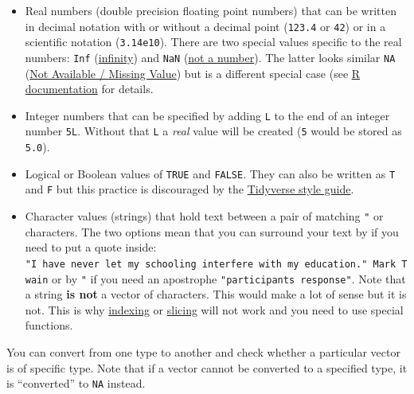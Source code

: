 \documentclass[
]{book}
\providecommand{\tightlist}{%
  \setlength{\itemsep}{0pt}\setlength{\parskip}{0pt}}
\begin{document}
\begin{itemize}
\tightlist
\item
  Real numbers (double precision floating point numbers) that can be written in decimal notation with or without a decimal point (\texttt{123.4} or \texttt{42}) or in a scientific notation (\texttt{3.14e10}). There are two special values specific to the real numbers: \texttt{Inf} (\href{https://stat.ethz.ch/R-manual/R-devel/library/base/html/is.finite.html}{infinity}) and \texttt{NaN} (\href{https://stat.ethz.ch/R-manual/R-devel/library/base/html/is.finite.html}{not a number}). The latter looks similar \texttt{NA} (\href{https://stat.ethz.ch/R-manual/R-devel/library/base/html/NA.html}{Not Available / Missing Value}) but is a different special case (see \href{https://stat.ethz.ch/R-manual/R-devel/library/base/html/is.finite.html}{R documentation} for details.
\item
  Integer numbers that can be specified by adding \texttt{L} to the end of an integer number \texttt{5L}. Without that \texttt{L} a \emph{real} value will be created (\texttt{5} would be stored as \texttt{5.0}).
\item
  Logical or Boolean values of \texttt{TRUE} and \texttt{FALSE}. They can also be written as \texttt{T} and \texttt{F} but this practice is discouraged by the \href{https://style.tidyverse.org/syntax.html?q=TRUE\#logical-vectors}{Tidyverse style guide}.
\item
  Character values (strings) that hold text between a pair of matching \texttt{"} or \texttt{\textquotesingle{}} characters. The two options mean that you can surround your text by \texttt{\textquotesingle{}} if you need to put a quote inside: \texttt{\textquotesingle{}"I\ have\ never\ let\ my\ schooling\ interfere\ with\ my\ education."\ Mark\ Twain\textquotesingle{}} or by \texttt{"} if you need an apostrophe \texttt{"participant\textquotesingle{}s\ response"}. Note that a string \textbf{is not} a vector of characters. This would make a lot of sense but it is not. This is why \protect\hyperlink{vector-index}{indexing} or \protect\hyperlink{vector-index-slicing}{slicing} will not work and you need to use special functions.
\end{itemize}

You can convert from one type to another and check whether a particular vector is of specific type. Note that if a vector cannot be converted to a specified type, it is ``converted'' to \texttt{NA} instead.
\end{document}
